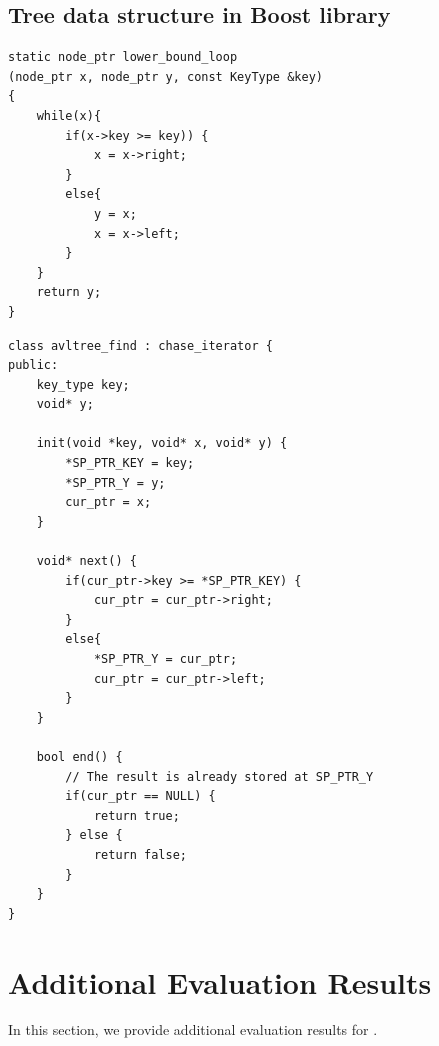 \begin{minipage}{0.47\textwidth}
\subsection{Tree data structure in Boost library}
\centering
\begin{lstlisting}[caption={Boost realization for \code{avltree::find()}},label={lst:avltree}, captionpos=t]
static node_ptr lower_bound_loop
(node_ptr x, node_ptr y, const KeyType &key)
{
    while(x){
        if(x->key >= key)) {
            x = x->right;
        }
        else{
            y = x;
            x = x->left;
        }
    }
    return y;
}
\end{lstlisting}

\begin{lstlisting}[caption={\name realization for \code{avltree::find()}},label={lst:avltree_mod}, captionpos=t]
class avltree_find : chase_iterator {
public:
    key_type key;
    void* y;
  
    init(void *key, void* x, void* y) {
        *SP_PTR_KEY = key;
        *SP_PTR_Y = y;
        cur_ptr = x;
    }
  
    void* next() {
        if(cur_ptr->key >= *SP_PTR_KEY) {
            cur_ptr = cur_ptr->right;
        }
        else{
            *SP_PTR_Y = cur_ptr;
            cur_ptr = cur_ptr->left;
        }
    }
  
    bool end() {
        // The result is already stored at SP_PTR_Y
        if(cur_ptr == NULL) {
            return true;
        } else {
            return false;
        }
    }
}
\end{lstlisting}
\end{minipage}

\section{\name Additional Evaluation Results}
\label{sec:appendix}

In this section, we provide additional evaluation results for \name.



